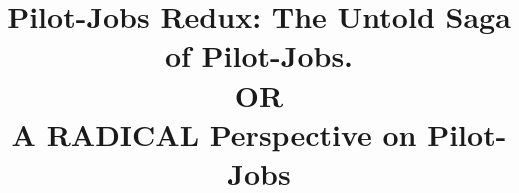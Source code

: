 \documentclass{sig-alternate}
\begin{document}

\title{Pilot-Jobs Redux: The Untold Saga of Pilot-Jobs. \\ OR \\  A RADICAL
  Perspective on Pilot-Jobs}

\end{document}
